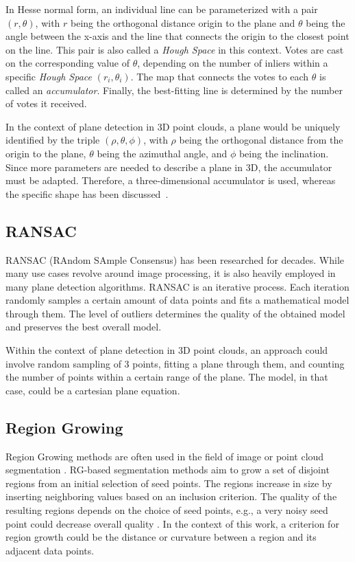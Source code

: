 \documentclass[main.tex]{subfiles}
\begin{document}
In Hesse normal form, an individual line can be parameterized with a pair $(r, \theta)$, with $r$  being the orthogonal distance origin to the plane and $\theta$ being the angle between the x-axis and the line that connects the origin to the closest point on the line.
This pair is also called a \textit{Hough Space} in this context. Votes are cast on the corresponding value of $\theta$, depending on the number of inliers within a specific \textit{Hough Space} $(r_i,\theta_i)$. The map that connects the
votes to each $\theta$ is called an \textit{accumulator}.
Finally, the best-fitting line is determined by the number of votes it received.

In the context of plane detection in 3D point clouds, a plane would be uniquely identified by the triple $(\rho, \theta, \phi)$, with $\rho$ being the orthogonal distance from the origin to the plane, $\theta$ being the azimuthal angle, and $\phi$ being the inclination.
Since more parameters are needed to describe a plane in 3D, the accumulator must be adapted.
Therefore, a three-dimensional accumulator is used, whereas the specific shape has been discussed~\cite*{Borrmann_Elseberg_Lingemann_Nüchter_2011}.

\subsection{RANSAC}
RANSAC (RAndom SAmple Consensus) has been researched for decades. While many use cases revolve around image processing, it is also heavily employed in many plane detection algorithms\cite{Sun_Mordohai_2019, Yang_Forstner, Ashraf_Ahmed_2017}.
RANSAC is an iterative process. Each iteration randomly samples a certain amount of data points and fits a mathematical model through them. The level of outliers determines the quality of the obtained model and preserves the best overall model.

Within the context of plane detection in 3D point clouds, an approach could involve random sampling of 3 points, fitting a plane through them,
and counting the number of points within a certain range of the plane\cite{Yang_Forstner}. The model, in that case, could be a cartesian plane equation.

\subsection{Region Growing}
Region Growing methods are often used in the field of image or point cloud segmentation \cite{Proença_Gao_2018, Vo_Truong-Hong_Laefer_Bertolotto_2015}.
RG-based segmentation methods aim to grow a set of disjoint regions from an initial selection of seed points. The regions increase in size by inserting neighboring values based on an inclusion criterion.
The quality of the resulting regions depends on the choice of seed points, e.g., a very noisy seed point could decrease overall quality  \cite{Malek_Rahman_Yasiran_Jumaat_Jalil_2012}.
In the context of this work, a criterion for region growth could be the distance or curvature between a region and its adjacent data points.
\end{document}
